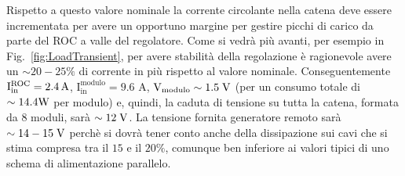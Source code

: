 Rispetto a questo valore nominale la corrente circolante nella catena deve essere incrementata per avere un opportuno margine per gestire picchi di carico da parte del ROC a valle del regolatore. Come si vedr\`a pi\`u avanti, per esempio in Fig.~\ref{fig:LoadTransient}, per avere stabilit\`a della regolazione \`e ragionevole avere un $\sim20-25\%$ di corrente in pi\`u rispetto al valore nominale.
Conseguentemente $\mathrm{I^{ROC}_{in}=2.4}\rm \, A$, $\mathrm{I_{in}^{modulo}=9.6}$ A, $\mathrm{V_{modulo}\sim1.5} \rm \; V$ (per un consumo totale di $\sim14.4{\mathrm W}$ per modulo) e, quindi, la caduta di tensione su tutta la catena, formata da 8 moduli, sarà $\sim 12\rm \; V$.
La tensione fornita generatore remoto sar\`a $\sim 14-15\rm \; V$ perch\`e si dovr\`a tener conto anche della dissipazione sui cavi che si stima compresa tra il $15$ e il $20\%$, comunque ben inferiore ai valori tipici di uno schema di alimentazione parallelo.
 
